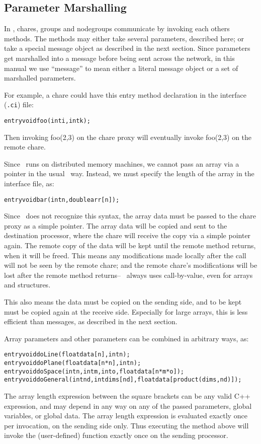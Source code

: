 \subsection{Parameter Marshalling}
\label{marshalling}

\experimental{}	
In \charmpp, chares, groups and 
nodegroups communicate by invoking each others methods. 
The methods may either take several parameters, described here; 
or take a special message object as described in the next section.
Since parameters get marshalled into a message before being
sent across the network, in this manual we use ``message''
to mean either a literal message object or a set of marshalled
parameters.

For example, a chare could have this entry method declaration in 
the interface ({\tt .ci}) file:
\begin{alltt}
  entry void foo(int i,int k);
\end{alltt}
Then invoking foo(2,3) on the chare proxy will eventually
invoke foo(2,3) on the remote chare.

Since \charmpp\ runs on distributed memory machines, we cannot
pass an array via a pointer in the usual \CC\ way.  Instead,
we must specify the length of the array in the interface file, as:
\begin{alltt}
  entry void bar(int n,double arr[n]);
\end{alltt}
Since \CC\ does not recognize this syntax, the array data
must be passed to the chare proxy as a simple pointer.
The array data will be copied and sent to the
destination processor, where the chare will receive the copy
via a simple pointer again.  The remote copy of the data
will be kept until the remote method returns, when
it will be freed.  
This means any modifications made locally after the call will not be 
seen by the remote chare; and the remote chare's modifications
will be lost after the remote method returns-- \charmpp\ always 
uses call-by-value, even for arrays and structures.  

This also means the data must be copied on the sending 
side, and to be kept must be copied again 
at the receive side.  Especially for large arrays, this 
is less efficient than messages, as described in the next section.

Array parameters and other parameters can be combined in arbitrary ways, as:
\begin{alltt}
  entry void doLine(float data[n],int n);
  entry void doPlane(float data[n*n],int n);
  entry void doSpace(int n,int m,int o,float data[n*m*o]);
  entry void doGeneral(int nd,int dims[nd],float data[product(dims,nd)]);
\end{alltt}
The array length expression between the square brackets can be 
any valid C++ expression, and may depend in any way on any of the passed
parameters, global variables, or global data.  The array length expression
is evaluated exactly once per invocation, on the sending side only.
Thus executing the  method above will invoke the 
(user-defined)  function exactly once on the sending
processor.

